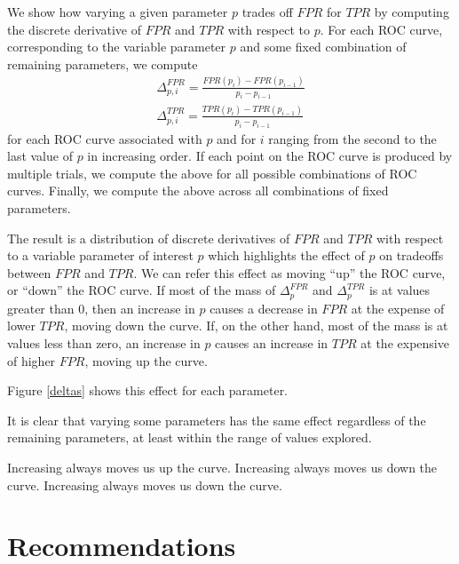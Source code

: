 We show how varying a given parameter $p$ trades off $FPR$ for $TPR$ by
computing the discrete derivative of $FPR$ and $TPR$ with respect to $p$. For
each ROC curve, corresponding to the variable parameter $p$ and some fixed
combination of remaining parameters, we compute
\begin{gather}
\Delta_{p,i}^{FPR} = \frac{FPR(p_{i}) - FPR(p_{i-1})}{p_i - p_{i-1}}\\
\Delta_{p,i}^{TPR} = \frac{TPR(p_{i}) - TPR(p_{i-1})}{p_i - p_{i-1}}
\end{gather}
for each ROC curve associated with $p$ and for $i$ ranging from the second to the last value
of $p$ in increasing order. If each point on the ROC curve is produced by
multiple trials, we compute the above for all possible combinations of ROC
curves. Finally, we compute the above across all combinations of fixed
parameters.

The result is a distribution of discrete derivatives of $FPR$ and $TPR$ with
respect to a variable parameter of interest $p$ which highlights the effect of
$p$ on tradeoffs between $FPR$ and $TPR$. We can refer this effect as moving
``up'' the ROC curve, or ``down'' the ROC curve. If most of the mass of
$\Delta_{p}^{FPR}$ and $\Delta_{p}^{TPR}$ is at values greater than 0, then an
increase in $p$ causes a decrease in $FPR$ at the expense of lower $TPR$, moving
down the curve. If, on the other hand, most of the mass is at values less than
zero, an increase in $p$ causes an increase in $TPR$ at the expensive of higher
$FPR$, moving up the curve.

Figure \ref{deltas} shows this effect for each parameter.


It is clear that varying some parameters has the same effect regardless of the
remaining parameters, at least within the range of values explored. 



Increasing  always moves us up the curve.
Increasing  always moves us down the curve.
Increasing  always moves us down the curve.





\section{Recommendations}
